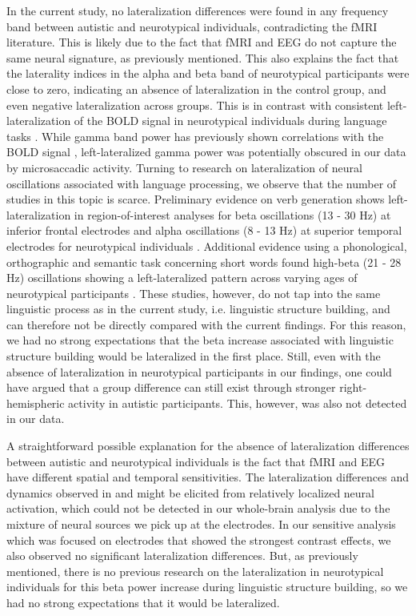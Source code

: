 In the current study, no lateralization differences were found in any frequency band between autistic and neurotypical individuals, contradicting the fMRI literature. This is likely due to the fact that fMRI and EEG do not capture the same neural signature, as previously mentioned. This also explains the fact that the laterality indices in the alpha and beta band of neurotypical participants were close to zero, indicating an absence of lateralization in the control group, and even negative lateralization across groups. This is in contrast with consistent left-lateralization of the BOLD signal in neurotypical individuals during language tasks \citep{fedorenko2010,pallier2011}. While gamma band power has previously shown correlations with the BOLD signal \citep{scheeringa2016}, left-lateralized gamma power was potentially obscured in our data by microsaccadic activity. Turning to research on lateralization of neural oscillations associated with language processing, we observe that the number of studies in this topic is scarce. Preliminary evidence on verb generation shows left-lateralization in region-of-interest analyses for beta oscillations (13 - 30 Hz) at inferior frontal electrodes and alpha oscillations (8 - 13 Hz) at superior temporal electrodes for neurotypical individuals \citep{nix2024}. Additional evidence using a phonological, orthographic and semantic task concerning short words found high-beta (21 - 28 Hz) oscillations showing a left-lateralized pattern across varying ages of neurotypical participants \citep{spironelli2010}. These studies, however, do not tap into the same linguistic process as in the current study, i.e. linguistic structure building, and can therefore not be directly compared with the current findings. For this reason, we had no strong expectations that the beta increase associated with linguistic structure building would be lateralized in the first place. Still, even with the absence of lateralization in neurotypical participants in our findings, one could have argued that a group difference can still exist through stronger right-hemispheric activity in autistic participants. This, however, was also not detected in our data. 

A straightforward possible explanation for the absence of lateralization differences between autistic and neurotypical individuals is the fact that fMRI and EEG have different spatial and temporal sensitivities. The lateralization differences and dynamics observed in \cite{jouravlev2020} and \cite{fedorenko2016} might be elicited from relatively localized neural activation, which could not be detected in our whole-brain analysis due to the mixture of neural sources we pick up at the electrodes. In our sensitive analysis which was focused on electrodes that showed the strongest contrast effects, we also observed no significant lateralization differences. But, as previously mentioned, there is no previous research on the lateralization in neurotypical individuals for this beta power increase during linguistic structure building, so we had no strong expectations that it would be lateralized. 

